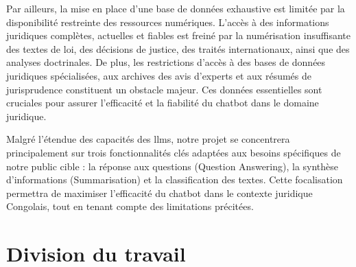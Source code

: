 Par ailleurs, la mise en place d'une base de données exhaustive est limitée par la disponibilité restreinte des ressources numériques. L'accès à des informations juridiques complètes, actuelles et fiables est freiné par la numérisation insuffisante des textes de loi, des décisions de justice, des traités internationaux, ainsi que des analyses doctrinales. De plus, les restrictions d'accès à des bases de données juridiques spécialisées, aux archives des avis d'experts et aux résumés de jurisprudence constituent un obstacle majeur. Ces données essentielles sont cruciales pour assurer l'efficacité et la fiabilité du chatbot dans le domaine juridique.

Malgré l'étendue des capacités des \acfp{llm}, notre projet se concentrera principalement sur trois fonctionnalités clés adaptées aux besoins spécifiques de notre public cible : la réponse aux questions (Question Answering), la synthèse d'informations (Summarisation) et la classification des textes. Cette focalisation permettra de maximiser l'efficacité du chatbot dans le contexte juridique Congolais, tout en tenant compte des limitations précitées.

\section{Division du travail}
		
